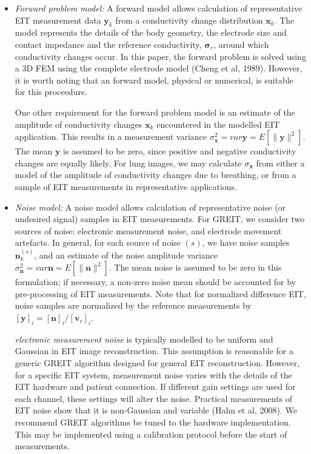 \documentclass[12pt]{iopart}
\newcommand{\vB}{\mbox{$\mathbf{v}$}}
\newcommand{\xB}{\mbox{$\mathbf{x}$}}
\newcommand{\nB}{\mbox{$\mathbf{n}$}}
\newcommand{\yB}{\mbox{$\mathbf{y}$}}
\newcommand{\sG}{\mbox{${\mathbf \sigma}$}}
\begin{document}
\begin{itemize}
\item[] 
{\em Forward problem model:}
A forward model allows calculation of representative EIT
 measurement
data $\yB_k$ from a conductivity change distribution $\xB_k$.
The model represents the details of the body geometry,
the electrode size and contact impedance and the reference
conductivity, $\sG_r$, around which conductivity changes occur.
In this paper, the forward problem is solved using a
3D FEM using the complete electrode model
(Cheng et al, 1989). However, it is worth noting that 
an forward model, physical or numerical, is suitable
for this proceedure.

One other requirement for the forward problem model is
an estimate of the amplitude of conductivity changes $\xB_k$
encountered in the modelled EIT application. This results in
a measurement variance $\sigma_{\xB}^2 = var \yB = E[ \| \yB \|^2 ]$. 
The mean $\yB$ is assumed to be zero, since positive and
negative conductivity changes are equally likely.
For lung images, we may calculate $\sigma_{\xB}$ from either
a model of the amplitude of conductivity changes due
to breathing, or from a sample of EIT measurements 
in representative applications.

\item[] 
{\em Noise model:}
A noise model allows calculation of representative 
noise (or undesired signal) samples in EIT measurements.
For GREIT, we consider two sources of noise:
electronic measurement noise, and
electrode movement artefacts. In general, for each
source of noise $(s)$, we have noise samples $\nB_k^{(s)}$,
and an estimate of the noise amplitude
variance $\sigma_{\nB}^2 = var \nB = E[ \| \nB \|^2 ]$. 
The mean noise is assumed to be zero in this formulation;
if necessary, a non-zero noise mean should be accounted for
by pre-processing of EIT measurements.
Note that for normalized difference EIT,
noise samples are normalized by the
reference measurements by $[\yB]_i = [\nB ]_i / [\vB_r]_i$.

{\em electronic measurement noise}
is typically modelled to be uniform and Gaussian in EIT
image reconstruction. This assumption is reasonable for
a generic GREIT algorithm designed for general EIT reconstruction.
However, for a specific EIT system, measurement noise
varies with the details of the EIT hardware and patient
connection. If different gain settings are used for each
channel, these settings will alter the noise. Practical
measurements of EIT noise show that it is non-Gaussian and
variable (Hahn et al, 2008). We recommend GREIT algorithms
be tuned to the hardware implementation. This may be 
implemented using a calibration protocol before the 
start of measurements.


\end{itemize}
\end{document}
